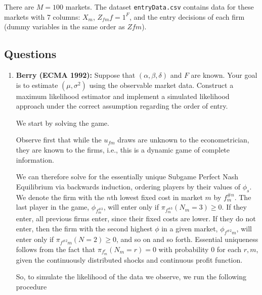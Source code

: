 \documentclass{article}
\begin{document}
There are $M = 100$ markets. The dataset \texttt{entryData.csv} contains data for these markets with 7 columns: $X_m$, ${Z_{fm}}{f=1}^{F}$, and the entry decisions of each firm (dummy variables in the same order as $Z{fm}$).

\subsection{Questions}

\begin{enumerate}
\item \textbf{Berry (ECMA 1992):} Suppose that $(\alpha, \beta, \delta)$ and $F$ are known. Your goal is to estimate $(\mu, \sigma^2)$ using the observable market data. Construct a maximum likelihood estimator and implement a simulated likelihood approach under the correct assumption regarding the order of entry.

\begin{answer}

We start by solving the game. 

Observe first that while the $u_{fm}$ draws are unknown to the econometrician, they are known to the firms, i.e., this is a dynamic game of complete information. 

We can therefore solve for the essentially unique Subgame Perfect Nash Equilibrium via backwards induction, ordering players by their  values of $\phi_s$. We denote the firm with the $n$th lowest fixed cost in market $m$ by $f_m^{\#n}$. The last player in the game, $\phi_{f^{\#3}_m}$, will enter only if $ \pi_{f^{\#3}_m }(N_m=3)\geq0$. If they enter, all previous firms enter, since  their fixed costs are lower. If they do not enter, then the firm with the second highest $\phi$ in a given market, $\phi_{f^{\#2}m}$, will enter only if $ \pi_{f^{\#2}m }(N=2)\geq 0$, and so on and so forth. Essential uniqueness follows from the fact that $ \pi_{f^{r}_m }(N_m=r)=0$ with probability 0 for each $r,m$, given the continuously distributed shocks and continuous profit function. 

So, to simulate the likelihood of the data we observe, we  run the following procedure  


\end{answer}
\end{enumerate}
\end{document}

